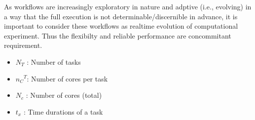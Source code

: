 As workflows are increasingly exploratory in nature and adptive (i.e.,
evolving) in a way that the full execution is not determinable/discernible in
advance, it is important to consider these workflows as realtime evolution of
computational experiment. Thus the flexibilty and reliable performance are
concommitant requirement.

\begin{itemize}
	\item $N_T$ : Number of tasks
	\item ${{n_C}^T}$: Number of cores per task
	\item $N_c$	: Number of cores (total)
	\item $t_x$ : Time durations of a task
\end{itemize}






